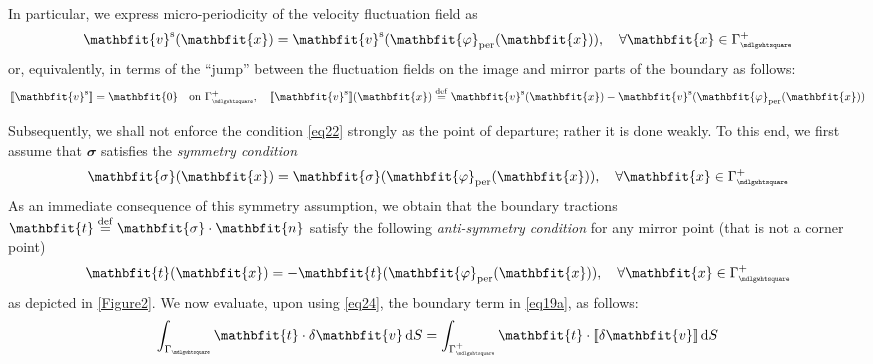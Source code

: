 \documentclass[12pt,a4paper]{article}
\renewcommand{\ta}[1]{\mathbfit{#1}}
\renewcommand{\ts}[1]{\mathbfit{#1}}
\renewcommand{\Box}{\mdlgwhtsquare}
\DeclarePairedDelimiter{\jmp}{[\![}{]\!]}
\newcommand{\per}{\mathrm{per}}
\newcommand{\rve}{
  {\mathchoice
   {\mbox{\scalebox{0.67}{$\Box$}}}
   {\mbox{\scalebox{0.67}{$\Box$}}}
   {\mbox{\scalebox{0.5}{$\Box$}}}
   {\mbox{\scalebox{0.375}{$\Box$}}}
  }
}
\begin{document}
In particular, we express micro-periodicity of the velocity fluctuation field as
\begin{equation}
    \ta v^\fluct(\ta{x}) = \ta v^\fluct(\ta{\varphi}_\per(\ta{x})), \quad
    \forall \ta{x}\in\Gamma_\rve^+
\label{eq21}
\end{equation}
or, equivalently, in terms of the ``jump'' between the fluctuation fields on the image and mirror parts of the boundary as follows:
\begin{equation}
    \jmp{\ta v^\fluct} = \ta{0} \quad \makebox{on } \Gamma_\rve^+, \quad
    \jmp{\ta v^\fluct}(\ta{x}) \defeq \ta v^\fluct(\ta{x})-\ta v^\fluct(\ta{\varphi}_\per(\ta{x}))
\label{eq22}
\end{equation}

Subsequently, we shall not enforce the condition \cref{eq22} strongly as the point of departure; rather it is done weakly.
To this end, we first assume that $\ts{\sigma}$ satisfies the \emph{symmetry condition}
\begin{equation}
    \ts{\sigma}(\ta{x}) = \ts{\sigma}(\ta{\varphi}_\per(\ta{x})), \quad
    \forall \ta{x}\in\Gamma_\rve^+
\label{eq23}
\end{equation}
As an immediate consequence of this symmetry assumption, we obtain that the boundary tractions $\ta{t}\defeq\ts{\sigma}\cdot\ta{n}$ satisfy the following \emph{anti-symmetry condition} for any mirror point (that is not a corner point)
\begin{equation}
    \ta{t}(\ta{x}) = -\ta{t}(\ta{\varphi}_\per(\ta{x})), \quad
    \forall \ta{x}\in\Gamma_\rve^+
\label{eq24}
\end{equation}
as depicted in \cref{Figure2}.
We now evaluate, upon using \cref{eq24}, the boundary term in
\cref{eq19a}, as follows:
\begin{equation}
    \int_{\Gamma_\rve} \ta{t} \cdot \delta \ta v \dif S =
    \int_{\Gamma_\rve^+} \ta{t} \cdot \jmp{\delta \ta v} \dif S
\label{eq25}
\end{equation}
\end{document}
